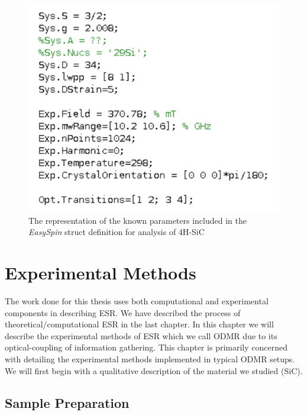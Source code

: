 \documentclass[oneside, noacknowlegments]{BYUPhys}
\begin{document}
\begin{figure}
    \centerline{\includegraphics{sic_params_commented_fig}}
    \caption[The \textit{EasySpin} Representation of SiC]{\label{fig:SiCParams}
     The representation of the known parameters included in the \textit{EasySpin} struct definition for analysis of 4H-SiC}
 \end{figure}
 










\chapter{Experimental Methods}

The work done for this thesis uses both computational and experimental components in describing ESR. We have described the process of theoretical/computational ESR in the last chapter. In this chapter we will describe the experimental methods of ESR which we call ODMR due to its optical-coupling of information gathering. This chapter is primarily concerned with detailing the experimental methods implemented in typical ODMR setups. We will first begin with a qualitative description of the material we studied (SiC).

\section{Sample Preparation}
\end{document}
